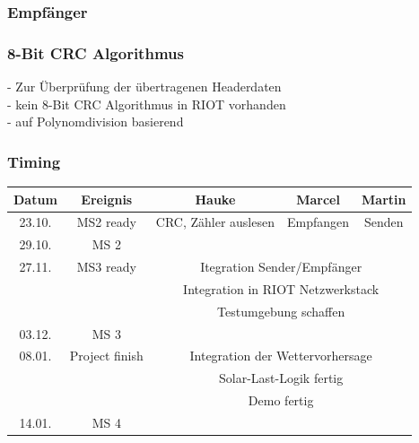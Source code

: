 \documentclass{beamer}
\begin{document}
 	
 	
 	\begin{frame} %
 		\frametitle{ Empfänger } %
 		
 		
 	\end{frame}
 	
 	\begin{frame}
 		\frametitle{8-Bit CRC Algorithmus} %
 		- Zur Überprüfung der übertragenen Headerdaten\\
 		- kein 8-Bit CRC Algorithmus in RIOT vorhanden\\
 		- auf Polynomdivision basierend
 		
 	\end{frame}
 	
 	
 	
 	\begin{frame}
 		\frametitle{ Timing }
 		\small
 		\begin{tabular}{|c|c|c|c|c|}
 			\hline 
 			Datum  & Ereignis & Hauke & Marcel & Martin \\ 
 			\hline 
 			23.10. & MS2 ready & CRC\checked, Zähler auslesen & Empfangen\checked & Senden\checked \\ 
 			\hline 
 			29.10. & MS 2 & & &\\
 			\hline 
 			27.11. & MS3 ready & \multicolumn{3}{|c|}{ Itegration Sender/Empfänger \checked} \\
 			&  & \multicolumn{3}{|c|}{ Integration in RIOT Netzwerkstack }\\
 			&  & \multicolumn{3}{|c|}{ Testumgebung schaffen \checked}\\
 			\hline 
 			03.12. & MS 3 & & & \\ 
 			\hline 
 			08.01. & Project finish & \multicolumn{3}{|c|}{ Integration der Wettervorhersage } \\  
 			&  & \multicolumn{3}{|c|}{ Solar-Last-Logik fertig }\\
 			&  & \multicolumn{3}{|c|}{ Demo fertig }\\
 			\hline
 			14.01. & MS 4 & & & \\ 
 			\hline 
 		\end{tabular} 
 	\end{frame}
 	
 	
 
\end{document}
